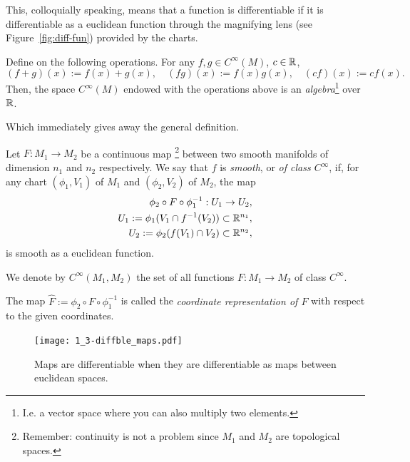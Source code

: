 This, colloquially speaking, means that a function is differentiable if it is differentiable as a euclidean function through the magnifying lens (see Figure~\ref{fig:diff-fun}) provided by the charts.

\begin{exercise}
  Define on the following operations.
  For any $f,g\in C^\infty(M)$, $c\in\mathbb{R}$,
  \begin{equation}
    (f+g)(x) := f(x) + g(x),\quad
    (fg)(x) := f(x) g(x),\quad
    (cf)(x) := c f(x).
  \end{equation}
  Then, the space $C^\infty(M)$ endowed with the operations above is an \emph{algebra}\footnote{I.e. a vector space where you can also multiply two elements.} over $\mathbb{R}$.
\end{exercise}

Which immediately gives away the general definition.

\begin{definition}
  Let $F:M_1\to M_2$ be a continuous map \footnote{Remember: continuity is not a problem since $M_1$ and $M_2$ are topological spaces.} between two smooth manifolds of dimension $n_1$ and $n_2$ respectively.
  We say that $f$ is \emph{smooth}, or \emph{of class $C^\infty$}, if, for any chart $(\phi_1, V_1)$ of $M_1$ and $(\phi_2, V_2)$ of $M_2$, the map
  \begin{align}
    \phi_2 \circ F \circ \phi_1^{-1}: U_1 \to U_2,\\
    U_1 := \phi_1(V_1 \cap f^{-1}(V_2))\subset\mathbb{R}^{n_1},\\
    U_2 := \phi_2(f(V_1) \cap V_2)\subset\mathbb{R}^{n_2},
  \end{align}
  is smooth as a euclidean function.

  We denote by $C^\infty(M_1, M_2)$ the set of all functions $F:M_1\to M_2$ of class $C^\infty$.

  The map $\hat F := \phi_2 \circ F \circ \phi_1^{-1}$ is called the \emph{coordinate representation of $F$} with respect to the given coordinates.
\end{definition}

\begin{figure}[htp]
  \centering
  \texttt{[image: 1\_3-diffble\_maps.pdf]}
  \caption{Maps are differentiable when they are differentiable as maps between euclidean spaces.}
  \label{fig:1.3-differentiable_maps}
\end{figure}

